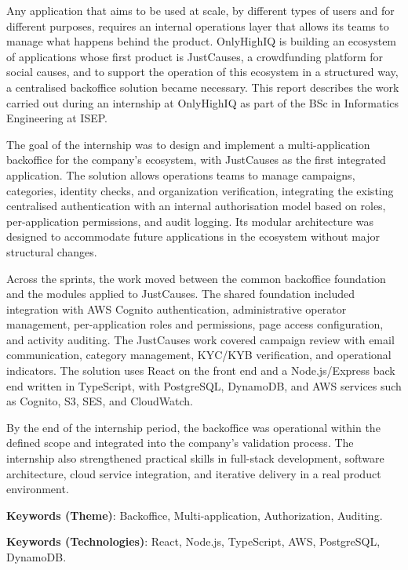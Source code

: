 \begin{abstractotherlanguage}

Any application that aims to be used at scale, by different types of users and for different purposes, requires an internal operations layer that allows its teams to manage what happens behind the product. OnlyHighIQ is building an ecosystem of applications whose first product is JustCauses, a crowdfunding platform for social causes, and to support the operation of this ecosystem in a structured way, a centralised backoffice solution became necessary. This report describes the work carried out during an internship at OnlyHighIQ as part of the BSc in Informatics Engineering at ISEP.

The goal of the internship was to design and implement a multi-application backoffice for the company's ecosystem, with JustCauses as the first integrated application. The solution allows operations teams to manage campaigns, categories, identity checks, and organization verification, integrating the existing centralised authentication with an internal authorisation model based on roles, per-application permissions, and audit logging. Its modular architecture was designed to accommodate future applications in the ecosystem without major structural changes.

Across the sprints, the work moved between the common backoffice foundation and the modules applied to JustCauses. The shared foundation included integration with AWS Cognito authentication, administrative operator management, per-application roles and permissions, page access configuration, and activity auditing. The JustCauses work covered campaign review with email communication, category management, KYC/KYB verification, and operational indicators. The solution uses React on the front end and a Node.js/Express back end written in TypeScript, with PostgreSQL, DynamoDB, and AWS services such as Cognito, S3, SES, and CloudWatch.

By the end of the internship period, the backoffice was operational within the defined scope and integrated into the company's validation process. The internship also strengthened practical skills in full-stack development, software architecture, cloud service integration, and iterative delivery in a real product environment.

\vspace{20mm}

\textbf{Keywords (Theme)}: Backoffice, Multi-application, Authorization, Auditing.

\textbf{Keywords (Technologies)}: React, Node.js, TypeScript, AWS, PostgreSQL, DynamoDB.

\end{abstractotherlanguage}



